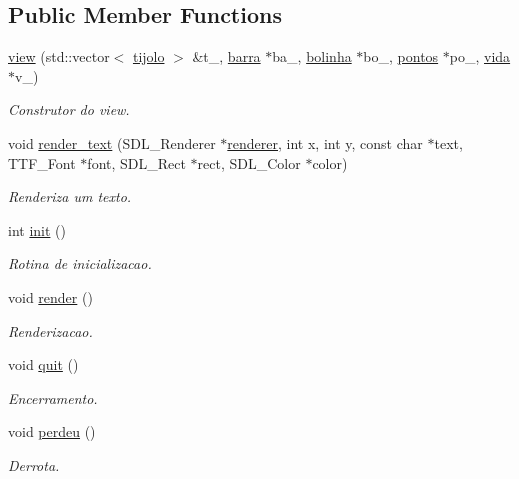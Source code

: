 \subsection*{Public Member Functions}
\begin{DoxyCompactItemize}
\item 
\hyperlink{classview_ae68420027fc8352dc303107eb0305ea6}{view} (std\+::vector$<$ \hyperlink{classtijolo}{tijolo} $>$ \&t\+\_\+, \hyperlink{classbarra}{barra} $\ast$ba\+\_\+, \hyperlink{classbolinha}{bolinha} $\ast$bo\+\_\+, \hyperlink{classpontos}{pontos} $\ast$po\+\_\+, \hyperlink{classvida}{vida} $\ast$v\+\_\+)
\begin{DoxyCompactList}\small\item\em Construtor do view. \end{DoxyCompactList}\item 
void \hyperlink{classview_afa73cff596b36c7009ee17383d039750}{render\+\_\+text} (S\+D\+L\+\_\+\+Renderer $\ast$\hyperlink{classview_a8d7b3ec0a0641d24cdc3b04949f5df45}{renderer}, int x, int y, const char $\ast$text, T\+T\+F\+\_\+\+Font $\ast$font, S\+D\+L\+\_\+\+Rect $\ast$rect, S\+D\+L\+\_\+\+Color $\ast$color)
\begin{DoxyCompactList}\small\item\em Renderiza um texto. \end{DoxyCompactList}\item 
int \hyperlink{classview_a21d953772b41dd9c08c9ea9895e002d7}{init} ()
\begin{DoxyCompactList}\small\item\em Rotina de inicializacao. \end{DoxyCompactList}\item 
void \hyperlink{classview_a91e9b24e39a9846a7093949c9a19a118}{render} ()
\begin{DoxyCompactList}\small\item\em Renderizacao. \end{DoxyCompactList}\item 
void \hyperlink{classview_ad8c046a243e52ee4f902abec6fbec9bb}{quit} ()
\begin{DoxyCompactList}\small\item\em Encerramento. \end{DoxyCompactList}\item 
void \hyperlink{classview_a1839c52cc61779be195b51e4fddcb659}{perdeu} ()
\begin{DoxyCompactList}\small\item\em Derrota. \end{DoxyCompactList}\item 

\end{DoxyCompactItemize}
